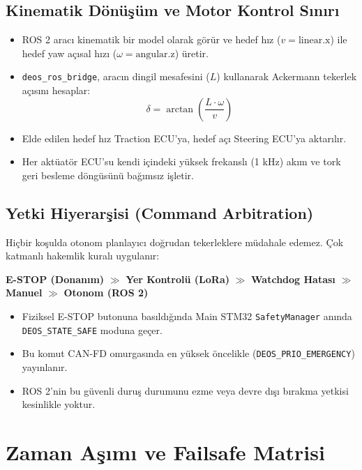 \documentclass[a4paper,11pt]{article}
\begin{document}
\subsection{Kinematik Dönüşüm ve Motor Kontrol Sınırı}
\begin{itemize}
    \item ROS 2 aracı kinematik bir model olarak görür ve hedef hız ($v = \text{linear.x}$) ile hedef yaw açısal hızı ($\omega = \text{angular.z}$) üretir.
    \item \texttt{deos\_ros\_bridge}, aracın dingil mesafesini ($L$) kullanarak Ackermann tekerlek açısını hesaplar:
    $$\delta = \arctan\left(\frac{L \cdot \omega}{v}\right)$$
    \item Elde edilen hedef hız Traction ECU'ya, hedef açı Steering ECU'ya aktarılır.
    \item Her aktüatör ECU'su kendi içindeki yüksek frekanslı (1 kHz) akım ve tork geri besleme döngüsünü bağımsız işletir.
\end{itemize}

\subsection{Yetki Hiyerarşisi (Command Arbitration)}
Hiçbir koşulda otonom planlayıcı doğrudan tekerleklere müdahale edemez. Çok katmanlı hakemlik kuralı uygulanır:

\vspace{0.3em}
\begin{center}
\textbf{E-STOP (Donanım)} $\boldsymbol{\gg}$ \textbf{Yer Kontrolü (LoRa)} $\boldsymbol{\gg}$ \textbf{Watchdog Hatası} $\boldsymbol{\gg}$ \textbf{Manuel} $\boldsymbol{\gg}$ \textbf{Otonom (ROS 2)}
\end{center}
\vspace{0.3em}

\begin{itemize}
    \item Fiziksel E-STOP butonuna basıldığında Main STM32 \texttt{SafetyManager} anında \texttt{DEOS\_STATE\_SAFE} moduna geçer.
    \item Bu komut CAN-FD omurgasında en yüksek öncelikle (\texttt{DEOS\_PRIO\_EMERGENCY}) yayınlanır.
    \item ROS 2'nin bu güvenli duruş durumunu ezme veya devre dışı bırakma yetkisi kesinlikle yoktur.
\end{itemize}

\clearpage

\section{Zaman Aşımı ve Failsafe Matrisi}
\end{document}
